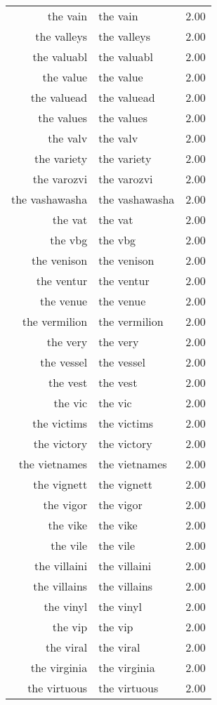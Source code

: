 \begin{table}[ht]
\begin{tabular}{rlr}
  the vain & the vain & 2.00 \\ 
  the valleys & the valleys & 2.00 \\ 
  the valuabl & the valuabl & 2.00 \\ 
  the value & the value & 2.00 \\ 
  the valuead & the valuead & 2.00 \\ 
  the values & the values & 2.00 \\ 
  the valv & the valv & 2.00 \\ 
  the variety & the variety & 2.00 \\ 
  the varozvi & the varozvi & 2.00 \\ 
  the vashawasha & the vashawasha & 2.00 \\ 
  the vat & the vat & 2.00 \\ 
  the vbg & the vbg & 2.00 \\ 
  the venison & the venison & 2.00 \\ 
  the ventur & the ventur & 2.00 \\ 
  the venue & the venue & 2.00 \\ 
  the vermilion & the vermilion & 2.00 \\ 
  the very & the very & 2.00 \\ 
  the vessel & the vessel & 2.00 \\ 
  the vest & the vest & 2.00 \\ 
  the vic & the vic & 2.00 \\ 
  the victims & the victims & 2.00 \\ 
  the victory & the victory & 2.00 \\ 
  the vietnames & the vietnames & 2.00 \\ 
  the vignett & the vignett & 2.00 \\ 
  the vigor & the vigor & 2.00 \\ 
  the vike & the vike & 2.00 \\ 
  the vile & the vile & 2.00 \\ 
  the villaini & the villaini & 2.00 \\ 
  the villains & the villains & 2.00 \\ 
  the vinyl & the vinyl & 2.00 \\ 
  the vip & the vip & 2.00 \\ 
  the viral & the viral & 2.00 \\ 
  the virginia & the virginia & 2.00 \\ 
  the virtuous & the virtuous & 2.00 \\ 

\end{tabular}
\end{table}
